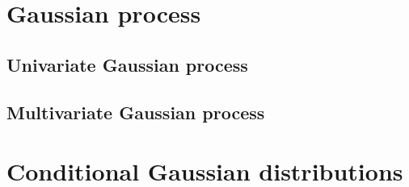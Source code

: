 \documentclass[iicol,sn-basic]{sn-jnl}%
\theoremstyle{thmstyleone}%
\theoremstyle{thmstyletwo}
\theoremstyle{thmstylethree}
\begin{document}
\begin{linenumbers}
\begin{appendices}
\section{Gaussian process}\label{SecA1}
\subsection{Univariate Gaussian process}

\subsection{Multivariate Gaussian process}

\section{Conditional Gaussian distributions}\label{SecA2}


\end{appendices}

\end{linenumbers}

% 

\end{document}
